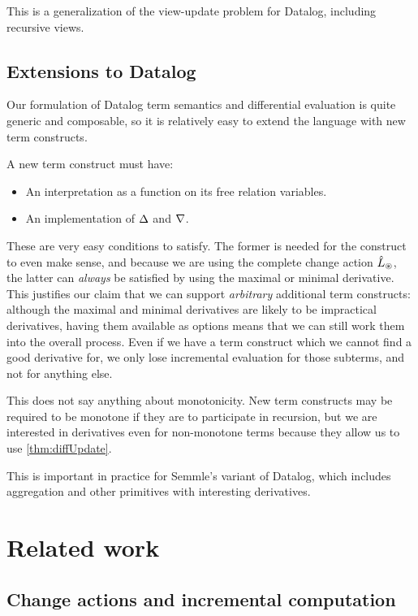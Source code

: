 This is a generalization of the view-update problem for Datalog, including recursive views.

\subsection{Extensions to Datalog}
\label{sec:extensions}

Our formulation of Datalog term semantics and differential evaluation is quite
generic and composable, so it is relatively easy to extend the language with new
term constructs.

A new term construct must have:
\begin{itemize}
  \item An interpretation as a function on its free relation variables.
  \item An implementation of $\Delta$ and $\nabla$.
\end{itemize}

These are very easy conditions to satisfy. The former is needed for the construct to even
make sense, and because we are using the complete change action
$\hat{L}_\circledast$, the latter can \emph{always} be satisfied by using the maximal or
minimal derivative. This justifies our claim that we can support
\emph{arbitrary} additional term constructs: although the maximal and minimal
derivatives are likely to be impractical derivatives, having them
available as options means that we can still work them into the overall process.
Even if we have a term construct which we cannot find a good derivative for, we only lose incremental
evaluation for those subterms, and not for anything else.

This does not say anything about monotonicity. New term constructs may
be required to be monotone if they are to participate in recursion, but we are
interested in derivatives even for non-monotone terms because they allow us to
use \cref{thm:diffUpdate}.

This is important in practice for Semmle's variant of Datalog, which includes
aggregation and other primitives with interesting derivatives. 

\section{Related work}

\subsection{Change actions and incremental computation}

